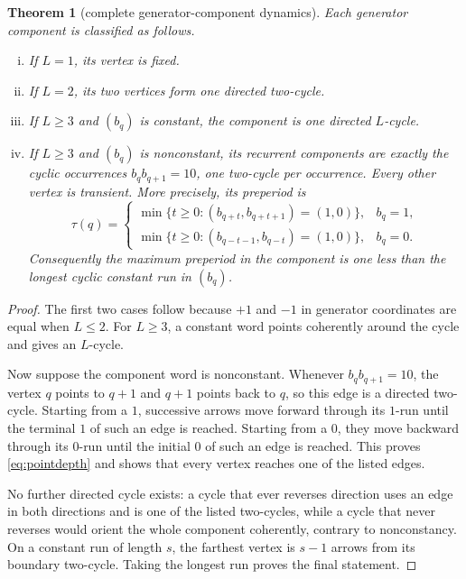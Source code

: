 \documentclass[a4paper,10pt]{amsart}
\newtheorem{theorem}{Theorem}[section]
\theoremstyle{remark}
\newcommand{\1}{\mathbf 1}
\begin{document}
\begin{theorem}[complete generator-component dynamics]\label{thm:component}
Each generator component is classified as follows.
\begin{enumerate}[(i)]
\item If $L=1$, its vertex is fixed.
\item If $L=2$, its two vertices form one directed two-cycle.
\item If $L\geq3$ and $(b_q)$ is constant, the component is one directed
      $L$-cycle.
\item If $L\geq3$ and $(b_q)$ is nonconstant, its recurrent components are
      exactly the cyclic occurrences $b_qb_{q+1}=10$, one two-cycle per
      occurrence.  Every other vertex is transient.  More precisely, its
      preperiod is
\begin{equation}\label{eq:pointdepth}
 \tau(q)=
 \begin{cases}
 \min\{t\geq0:(b_{q+t},b_{q+t+1})=(1,0)\},&b_q=1,\\
 \min\{t\geq0:(b_{q-t-1},b_{q-t})=(1,0)\},&b_q=0.
 \end{cases}
\end{equation}
Consequently the maximum preperiod in the component is one less than the
longest cyclic constant run in $(b_q)$.
\end{enumerate}
\end{theorem}

\begin{proof}
The first two cases follow because $+1$ and $-1$ in generator coordinates
are equal when $L\leq2$.  For $L\geq3$, a constant word points coherently
around the cycle and gives an $L$-cycle.

Now suppose the component word is nonconstant.  Whenever $b_qb_{q+1}=10$,
the vertex $q$ points to $q+1$ and $q+1$ points back to $q$, so this edge is
a directed two-cycle.  Starting from a $1$, successive arrows move forward
through its $1$-run until the terminal $1$ of such an edge is reached.
Starting from a $0$, they move backward through its $0$-run until the
initial $0$ of such an edge is reached.  This proves \eqref{eq:pointdepth}
and shows that every vertex reaches one of the listed edges.

No further directed cycle exists: a cycle that ever reverses direction
uses an edge in both directions and is one of the listed two-cycles, while a
cycle that never reverses would orient the whole component coherently,
contrary to nonconstancy.  On a constant run of length $s$, the farthest
vertex is $s-1$ arrows from its boundary two-cycle.  Taking the longest run
proves the final statement.
\end{proof}
\end{document}
